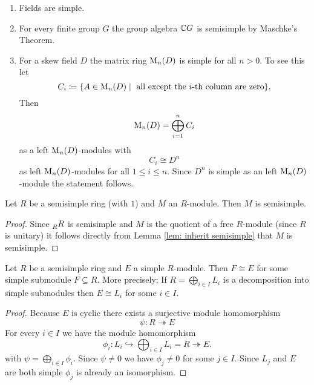 \begin{expls}
  \begin{enumerate}[label=\emph{\alph*)},leftmargin=*]
    \item
      Fields are simple.
    \item
      For every finite group $G$ the group algebra $\mathbb{C} G$ is semisimple by Maschke’s Theorem.
    \item
      For a skew field $D$ the matrix ring $\operatorname{M}_n(D)$ is simple for all $n > 0$.
      To see this let
      \[
        C_i
        \coloneqq \{
                    A \in \operatorname{M}_n(D)
                  \mid
                    \text{ all except the $i$-th column are zero}
                  \}.
      \]
      Then
      \[
          \operatorname{M}_n(D)
        = \bigoplus_{i=1}^n C_i
      \]
      as a left $\operatorname{M}_n(D)$-modules with
      \[
        C_i \cong D^n
      \]
      as left $\operatorname{M}_n(D)$-modules for all $1 \leq i \leq n$.
      Since $D^n$ is simple as an left $\operatorname{M}_n(D)$-module the statement follows.
  \end{enumerate}
\end{expls}


\begin{prop}
  Let $R$ be a semisimple ring (with $1$) and $M$ an $R$-module.
  Then $M$ is semisimple.
\end{prop}
\begin{proof}
  Since $\prescript{}{R}{R}$ is semisimple and $M$ is the quotient of a free $R$-module (since $R$ is unitary) it follows directly from Lemma \ref{lem: inherit semisimple} that $M$ is semisimple.
\end{proof}


\begin{lem}\label{lem: simple module of semisimple ring is direct summand}
  Let $R$ be a semisimple ring and $E$ a simple $R$-module.
  Then $F \cong E$ for some simple submodule $F \subseteq R$.
  More precisely:
  If $R = \bigoplus_{i \in I} L_i$ is a decomposition into simple submodules then $E \cong L_i$ for some $i \in I$.
\end{lem}
\begin{proof}
  Because $E$ is cyclic there exists a surjective module homomorphism
  \[
                        \psi
    \colon              R
    \twoheadrightarrow  E
  \]
  For every $i \in I$ we have the module homomorphism
  \[
                        \phi_i
    \colon              L_i
    \hookrightarrow     \bigoplus_{i \in I} L_i
    =                   R
    \twoheadrightarrow  E.
  \]
  with $\psi = \bigoplus_{i \in I} \phi_i$.
  Since $\psi \neq 0$ we have $\phi_j \neq 0$ for some $j \in I$.
  Since $L_j$ and $E$ are both simple $\phi_j$ is already an isomorphism.
\end{proof}


